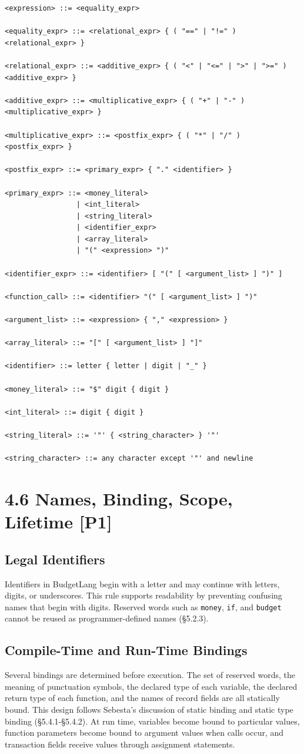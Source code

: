 \documentclass[11pt]{article}
\begin{document}
\begin{verbatim}
<expression> ::= <equality_expr>

<equality_expr> ::= <relational_expr> { ( "==" | "!=" ) <relational_expr> }

<relational_expr> ::= <additive_expr> { ( "<" | "<=" | ">" | ">=" ) <additive_expr> }

<additive_expr> ::= <multiplicative_expr> { ( "+" | "-" ) <multiplicative_expr> }

<multiplicative_expr> ::= <postfix_expr> { ( "*" | "/" ) <postfix_expr> }

<postfix_expr> ::= <primary_expr> { "." <identifier> }

<primary_expr> ::= <money_literal>
                 | <int_literal>
                 | <string_literal>
                 | <identifier_expr>
                 | <array_literal>
                 | "(" <expression> ")"

<identifier_expr> ::= <identifier> [ "(" [ <argument_list> ] ")" ]

<function_call> ::= <identifier> "(" [ <argument_list> ] ")"

<argument_list> ::= <expression> { "," <expression> }

<array_literal> ::= "[" [ <argument_list> ] "]"

<identifier> ::= letter { letter | digit | "_" }

<money_literal> ::= "$" digit { digit }

<int_literal> ::= digit { digit }

<string_literal> ::= '"' { <string_character> } '"'

<string_character> ::= any character except '"' and newline
\end{verbatim}

\section*{4.6 Names, Binding, Scope, Lifetime [P1]}
\subsection*{Legal Identifiers}
Identifiers in BudgetLang begin with a letter and may continue with letters, digits, or underscores. This rule supports readability by preventing confusing names that begin with digits. Reserved words such as \texttt{money}, \texttt{if}, and \texttt{budget} cannot be reused as programmer-defined names (\S5.2.3).

\subsection*{Compile-Time and Run-Time Bindings}
Several bindings are determined before execution. The set of reserved words, the meaning of punctuation symbols, the declared type of each variable, the declared return type of each function, and the names of record fields are all statically bound. This design follows Sebesta's discussion of static binding and static type binding (\S5.4.1-\S5.4.2). At run time, variables become bound to particular values, function parameters become bound to argument values when calls occur, and transaction fields receive values through assignment statements.
\end{document}
